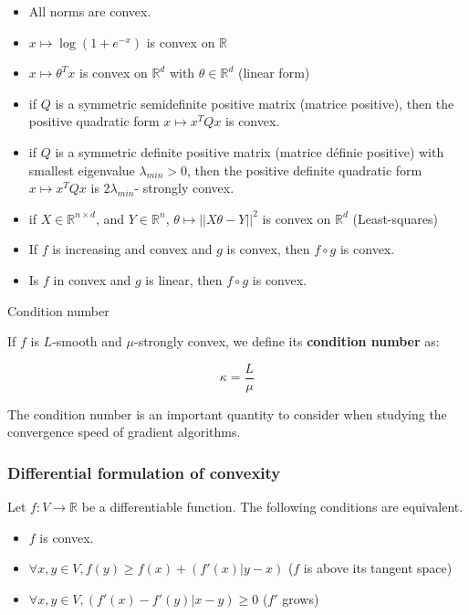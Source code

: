 \documentclass[
10pt, %
a4paper, %
oneside, %
headinclude,footinclude, %
BCOR5mm, %
]{scrartcl}
\begin{document}
\begin{itemize}
    \item All norms are convex.
    \item $x\mapsto \log(1+e^{-x})$ is convex on $ \mathbb{R} $
    \item $x\mapsto \theta^Tx$ is convex on $ \mathbb{R}^d$ with $\theta \in \mathbb{R}^d$ (linear form)
    \item if $Q$ is a symmetric semidefinite positive matrix (matrice positive), then the positive quadratic form $x\mapsto x^TQx$ is convex.
    \item if $Q$ is a symmetric definite positive matrix (matrice définie positive) with smallest eigenvalue $\lambda_{min}>0$, then the positive definite quadratic form $x\mapsto x^TQx$ is $ 2\lambda_{min}$- strongly convex.
    \item if $X\in \mathbb{R}^{n\times d}$, and $Y\in \mathbb{R}^n$, $\theta\mapsto ||X\theta-Y||^2$ is convex on $ \mathbb{R}^d$ (Least-squares)
    \item If $f$ is increasing and convex and $g$ is convex, then $f \circ g $ is convex.
    \item Is $f$ in convex and $g$ is linear, then $f \circ g $ is convex.
\end{itemize}

\begin{definition}{Condition number}

    If $f$ is $L$-smooth and $\mu$-strongly convex, we define its \textbf{{condition number}} as:

    \begin{equation*}
        \kappa = \frac{L}{\mu} 
    \end{equation*}

\end{definition}

\begin{remark}
    The condition number is an important quantity to consider when studying the convergence speed of gradient algorithms.
\end{remark}


\subsubsection{\large\color{Periwinkle}Differential formulation of convexity}

\begin{proposition}
    \label{prop:conv}
    Let $f:V \rightarrow \mathbb{R} $ be a differentiable function. The following conditions are equivalent.
    \begin{itemize}
        \item $f$ is convex.
	\item $\forall x, y\in V, f(y)\geq f(x)+(f'(x)|y-x)$ ($f$ is above its tangent space)
	\item $\forall x, y\in V, (f'(x)-f'(y)|x-y)\geq 0$ ($f'$ grows)
    \end{itemize}
\end{proposition}
\end{document}

